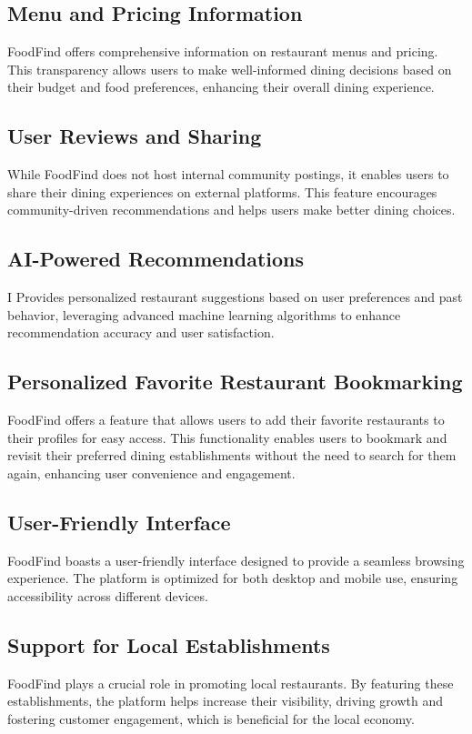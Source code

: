 \documentclass[12pt, a4paper, oneside]{article}
\begin{document}
\subsection{Menu and Pricing Information}
FoodFind offers comprehensive information on restaurant menus and pricing. This transparency allows users to make well-informed dining decisions based on their budget and food preferences, enhancing their overall dining experience.

\subsection{User Reviews and Sharing}
While FoodFind does not host internal community postings, it enables users to share their dining experiences on external platforms. This feature encourages community-driven recommendations and helps users make better dining choices.
\subsection{AI-Powered Recommendations} I
Provides personalized restaurant suggestions based on user preferences and past behavior, leveraging advanced machine learning algorithms to enhance recommendation accuracy and user satisfaction.
\subsection{Personalized Favorite Restaurant Bookmarking}
FoodFind offers a feature that allows users to add their favorite restaurants to their profiles for easy access. This functionality enables users to bookmark and revisit their preferred dining establishments without the need to search for them again, enhancing user convenience and engagement.

\subsection{User-Friendly Interface}
FoodFind boasts a user-friendly interface designed to provide a seamless browsing experience. The platform is optimized for both desktop and mobile use, ensuring accessibility across different devices.

\subsection{Support for Local Establishments}
FoodFind plays a crucial role in promoting local restaurants. By featuring these establishments, the platform helps increase their visibility, driving growth and fostering customer engagement, which is beneficial for the local economy.
\end{document}
